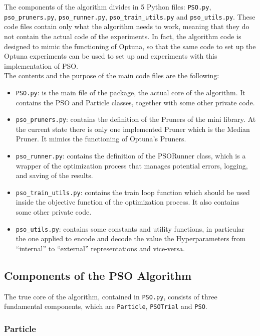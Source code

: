 The components of the algorithm divides in 5 Python files: \texttt{PSO.py}, \texttt{pso\_pruners.py}, \texttt{pso\_runner.py}, \texttt{pso\_train\_utils.py} and \texttt{pso\_utils.py}.
These code files contain only what the algorithm needs to work, meaning that they do not contain the actual code of the experiments. In fact, the algorithm code is designed to mimic the functioning of Optuna, so that the same code to set up the Optuna experiments can be used to set up and experiments with this implementation of PSO.
% 
\\[0.3cm]The contents and the purpose of the main code files are the following:
\begin{itemize}[itemsep=0.1cm]
    \item \texttt{PSO.py}: is the main file of the package, the actual core of the algorithm. It contains the PSO and Particle classes, together with some other private code.
    \item \texttt{pso\_pruners.py}: contains the definition of the Pruners of the mini library. At the current state there is only one implemented Pruner which is the Median Pruner. It mimics the functioning of Optuna's Pruners.
    \item \texttt{pso\_runner.py}: contains the definition of the PSORunner class, which is a wrapper of the optimization process that manages potential errors, logging, and saving of the results.
    \item \texttt{pso\_train\_utils.py}: contains the train loop function which should be used inside the objective function of the optimization process. It also contains some other private code.
    \item \texttt{pso\_utils.py}: contains some constants and utility functions, in particular the one applied to encode and decode the value the Hyperparameters from “internal” to “external” representations and vice-versa.
\end{itemize}

\subsection{Components of the PSO Algorithm}

The true core of the algorithm, contained in \texttt{PSO.py}, consists of three fundamental components, which are \texttt{Particle}, \texttt{PSOTrial} and \texttt{PSO}.

\subsubsection{Particle}

